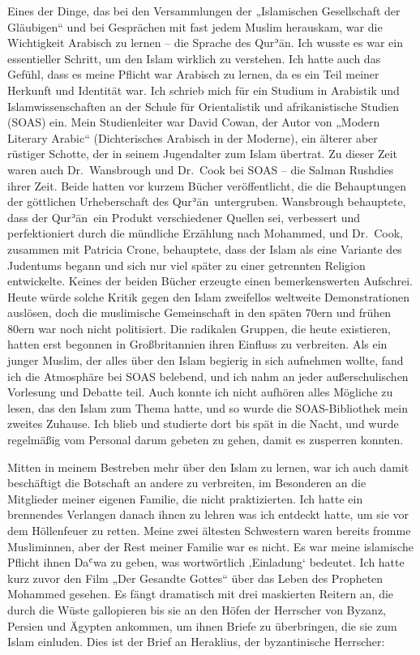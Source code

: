 \documentclass[12pt]{memoir}
\def\´{ʾ} %
\def\`{ʿ} %
\def \Quran{Qur\-\´ān} %
\begin{document}
Eines der Dinge, das bei den Versammlungen
der „Islamischen Gesellschaft der Gläubigen“ und bei Gesprächen
mit fast jedem Muslim herauskam,
war die Wichtigkeit Arabisch zu lernen – die Sprache des \Quran.
Ich wusste es war ein essentieller Schritt,
um den Islam wirklich zu verstehen.
Ich hatte auch das Gefühl, dass es meine Pflicht war Arabisch zu lernen,
da es ein Teil meiner Herkunft und Identität war.
Ich schrieb mich für ein Studium in Arabistik und Islamwissenschaften
an der Schule für Orientalistik und afrikanistische Studien (SOAS) ein.
Mein Studienleiter war David Cowan, der Autor von „Modern Literary Arabic“
(Dichterisches Arabisch in der Moderne), ein älterer aber rüstiger Schotte,
der in seinem Jugendalter zum Islam übertrat.
Zu dieser Zeit waren auch Dr.\ Wansbrough und Dr.\ Cook bei SOAS –
die Salman Rushdies ihrer Zeit.
Beide hatten vor kurzem Bücher veröffentlicht,
die die Behauptungen der göttlichen Urheberschaft des \Quran\ untergruben.
Wansbrough behauptete, dass der \Quran\ ein Produkt verschiedener Quellen sei,
verbessert und perfektioniert durch die mündliche Erzählung nach Mohammed,
und Dr.\ Cook, zusammen mit Patricia Crone, behauptete,
dass der Islam als eine Variante des Judentums begann
und sich nur viel später zu einer getrennten Religion entwickelte.
Keines der beiden Bücher erzeugte einen bemerkenswerten Aufschrei.
Heute würde solche Kritik gegen den Islam zweifellos
weltweite Demonstrationen auslösen,
doch die muslimische Gemeinschaft in den späten 70ern und frühen 80ern
war noch nicht politisiert.
Die radikalen Gruppen, die heute existieren,
hatten erst begonnen in Großbritannien ihren Einfluss zu verbreiten.
Als ein junger Muslim,
der alles über den Islam begierig in sich aufnehmen wollte,
fand ich die Atmosphäre bei SOAS belebend,
und ich nahm an jeder außerschulischen Vorlesung und Debatte teil.
Auch konnte ich nicht aufhören alles Mögliche zu lesen,
das den Islam zum Thema hatte,
und so wurde die SOAS-Bibliothek mein zweites Zuhause.
Ich blieb und studierte dort bis spät in die Nacht,
und wurde regelmäßig vom Personal darum gebeten zu gehen,
damit es zusperren konnten.

Mitten in meinem Bestreben mehr über den Islam zu lernen,
war ich auch damit beschäftigt die Botschaft an andere zu verbreiten,
im Besonderen an die Mitglieder meiner eigenen Familie,
die nicht praktizierten.
Ich hatte ein brennendes Verlangen danach ihnen zu lehren was ich
entdeckt hatte, um sie vor dem Höllenfeuer zu retten.
Meine zwei ältesten Schwestern waren bereits fromme Musliminnen,
aber der Rest meiner Familie war es nicht.
Es war meine islamische Pflicht ihnen Da\`wa zu geben,
was wortwörtlich ‚Einladung‘ bedeutet.
Ich hatte kurz zuvor den Film „Der Gesandte Gottes“
über das Leben des Propheten Mohammed gesehen.
Es fängt dramatisch mit drei maskierten Reitern an,
die durch die Wüste gallopieren bis sie an den Höfen der Herrscher
von Byzanz, Persien und Ägypten ankommen, um ihnen Briefe zu überbringen,
die sie zum Islam einluden.
Dies ist der Brief an Heraklius, der byzantinische Herrscher:
\end{document}
